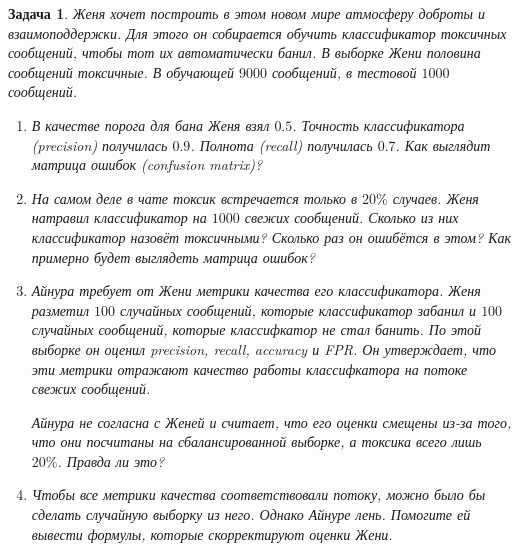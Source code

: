 \documentclass[12pt,fleqn]{article}
\newtheorem{esProblem}{Задача}
\begin{document}
\begin{esProblem}
Женя хочет построить в этом новом мире атмосферу доброты и взаимоподдержки. Для этого он собирается обучить классификатор токсичных сообщений, чтобы тот их автоматически банил. В выборке Жени половина сообщений токсичные. В обучающей $9000$ сообщений, в тестовой $1000$ сообщений. 

\begin{enumerate} 
    \item В качестве порога для бана Женя взял $0.5$. Точность  классификатора (precision) получилась $0.9$. Полнота (recall) получилась $0.7$. Как выглядит матрица ошибок (confusion matrix)? 
    
    \item На самом деле в чате токсик встречается только в $20\%$ случаев. Женя натравил классификатор на $1000$ свежих сообщений. Сколько из них классификатор назовёт токсичными? Сколько раз он ошибётся в этом? Как примерно будет выглядеть матрица ошибок? 
    
    \item Айнура требует от Жени метрики качества его классификатора. Женя разметил $100$ случайных сообщений, которые классификатор забанил и $100$ случайных сообщений, которые классифкатор не стал банить. По этой выборке он оценил precision, recall, accuracy и FPR. Он утверждает, что эти метрики отражают качество работы классифкатора на потоке свежих сообщений.  
    
    Айнура не согласна с Женей и считает, что его оценки смещены из-за того, что они посчитаны на сбалансированной выборке, а токсика всего лишь $20\%$. Правда ли это?
    
    \item Чтобы все метрики качества соответствовали потоку, можно было бы сделать случайную выборку из него. Однако Айнуре лень. Помогите ей вывести формулы, которые скорректируют оценки Жени.
\end{enumerate} 
\end{esProblem}
\end{document}
